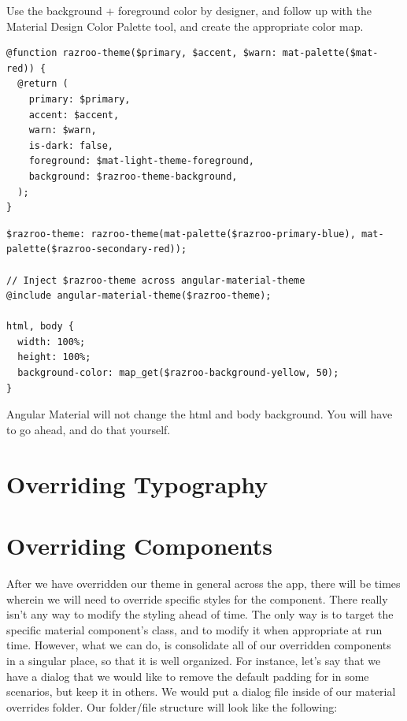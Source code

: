 Use the background + foreground color by designer, and follow up with the 
Material Design Color Palette tool, and create the appropriate color map.

\begin{lstlisting}[caption=What custom theme function would look like]
@function razroo-theme($primary, $accent, $warn: mat-palette($mat-red)) {
  @return (
    primary: $primary,
    accent: $accent,
    warn: $warn,
    is-dark: false,
    foreground: $mat-light-theme-foreground,
    background: $razroo-theme-background,
  );
}  
\end{lstlisting}

\begin{lstlisting}[caption=html and body override]
$razroo-theme: razroo-theme(mat-palette($razroo-primary-blue), mat-palette($razroo-secondary-red));

// Inject $razroo-theme across angular-material-theme
@include angular-material-theme($razroo-theme);  

html, body {
  width: 100%;
  height: 100%;
  background-color: map_get($razroo-background-yellow, 50);
}
\end{lstlisting}

Angular Material will not change the html and body background. You will have to
go ahead, and do that yourself. 

\section{Overriding Typography}


\section{Overriding Components}
After we have overridden our theme in general across the app, there will be 
times wherein we will need to override specific styles for the component. 
There really isn't any way to modify the styling ahead of time. The only way
is to target the specific material component's class, and to modify it when 
appropriate at run time. However, what we can do, is consolidate all of our 
overridden components in a singular place, so that it is well organized. For
instance, let's say that we have a dialog that we would like to remove the 
default padding for in some scenarios, but keep it in others. We would put a 
dialog file inside of our material overrides folder. Our folder/file structure 
will look like the following: 

